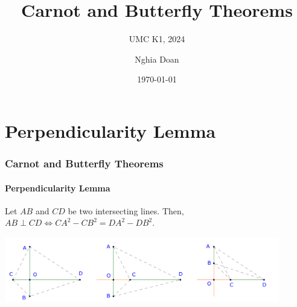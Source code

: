 \documentclass[8pt,xcolor=table,dvipsnames]{beamer}
\title{Carnot and Butterfly Theorems}
\subtitle{UMC K1, 2024}
\author{Nghia Doan}
\institute{MCC Club \& Competitions}
\date{\today}
\begin{document}
\section{Perpendicularity Lemma}

\begin{frame}[t]
    \frametitle{Carnot and Butterfly Theorems}
    \framesubtitle{Perpendicularity Lemma}
    \begin{theorem}
        Let $AB$ and $CD$ be two intersecting lines. Then, $AB \perp CD \Longleftrightarrow CA^2 - CB^2 = DA^2 - DB^2.$
    \end{theorem}
    
    \begin{center}
        \includegraphics[width=12cm]{./svg/pdf/perpendicular-lemma.pdf}
    \end{center}


\end{frame}
\end{document}
